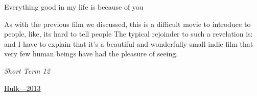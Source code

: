 \documentclass[../butidigress.tex]{subfiles}
\begin{document}
\epigraph{Everything good in my life is because of you}{}

As with the previous film we discussed, this is a difficult movie to introduce to people, like, its hard to tell people 
The typical rejoinder to such a revelation is:  and I have to explain that it's a beautiful and wonderfully small indie film that very few human beings have had the pleasure of seeing.

\begin{somenotes}{\textit{Short Term 12}}
    \item \href{https://birthmoviesdeath.com/2013/03/16/sxsw-review-why-short-term-12-is-a-masterpiece}{Hulk---2013}\autocite{hulkshortterm2015}
\end{somenotes}
\end{document}
